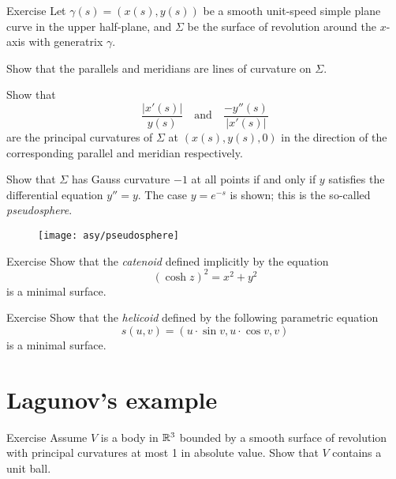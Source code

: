 \begin{thm}{Exercise}\label{ex:principal-revolution}
Let $\gamma(s)=(x(s),y(s))$ be a smooth unit-speed simple plane curve in the upper half-plane,
and  $\Sigma$ be the surface of revolution around the $x$-axis with generatrix $\gamma$.


\begin{subthm}{}
Show that the parallels and meridians are lines of curvature on $\Sigma$.
\end{subthm}

\begin{subthm}{}
Show that 
\[\frac{|x'(s)|}{y(s)}
\quad
\text{and}
\quad
\frac{-y''(s)}{|x'(s)|}
\]
are the principal curvatures of $\Sigma$ at $(x(s),y(s),0)$ in the direction of the corresponding parallel and meridian respectively.
\end{subthm}

\begin{subthm}{}
Show that $\Sigma$ has Gauss curvature $-1$ at all points if and only if $y$ satisfies the differential equation $y''=y$. 
The case  $y=e^{-s}$ is shown; this is the so-called \emph{pseudosphere}.
\end{subthm}

\end{thm}

\begin{figure}[h!]
\vskip-3mm
\hskip30mm
\texttt{[image: asy/pseudosphere]}
\vskip-3mm
\end{figure}

\begin{thm}{Exercise}\label{ex:catenoid-is-minimal}
Show that the \emph{catenoid} defined implicitly by the equation
\[(\cosh z)^2=x^2+y^2\]
is a minimal surface.
\end{thm}

\begin{thm}{Exercise}\label{ex:helicoid-is-minimal}
Show that the \emph{helicoid} defined by the following parametric equation
\[s(u,v)=(u\cdot \sin v,u\cdot \cos v,v)\]
is a minimal surface.
\end{thm}

\section{Lagunov's example}

\begin{thm}{Exercise}\label{ex:moon-revolution}
Assume $V$ is a body in $\mathbb{R}^3$ bounded by a smooth surface of revolution with principal curvatures at most 1 in absolute value.
Show that $V$ contains a unit ball.
\end{thm}

